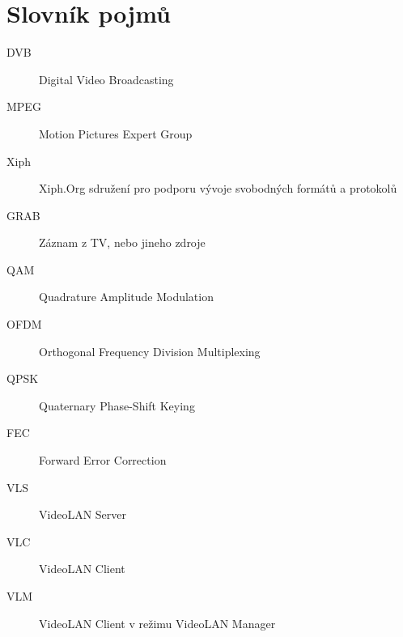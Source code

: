 
\chapter{Slovník pojmů}
\begin{description}
\item[DVB] Digital Video Broadcasting
\item[MPEG] Motion Pictures Expert Group
\item[Xiph] Xiph.Org sdružení pro podporu vývoje svobodných formátů a protokolů
\item[GRAB] Záznam z TV, nebo jineho zdroje
\item[QAM] Quadrature Amplitude Modulation
\item[OFDM] Orthogonal Frequency Division Multiplexing
\item[QPSK] Quaternary Phase-Shift Keying 
\item[FEC] Forward Error Correction 
\item[VLS] VideoLAN Server 
\item[VLC] VideoLAN Client 
\item[VLM] VideoLAN Client v režimu VideoLAN Manager 
\end{description}

